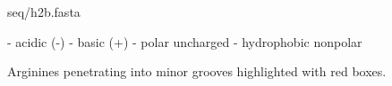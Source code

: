 \documentclass[12pt,onecolumn]{scrartcl}
\begin{document}
\begin{landscape}
\begin{texshade}{seq/h2b.fasta}
\featurerule{1mm}



\end{texshade}


 - acidic (-)
 - basic (+)
 - polar uncharged
 - hydrophobic nonpolar

Arginines penetrating into minor grooves highlighted with red boxes.



\end{landscape}

%

%

\end{document}
